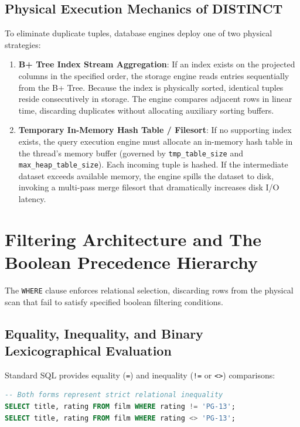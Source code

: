 \documentclass[10pt,journal,compsoc,onecolumn]{IEEEtran}
\begin{document}
\subsection{Physical Execution Mechanics of DISTINCT}
To eliminate duplicate tuples, database engines deploy one of two physical strategies:
\begin{enumerate}
    \item \textbf{B+ Tree Index Stream Aggregation}: If an index exists on the projected columns in the specified order, the storage engine reads entries sequentially from the B+ Tree. Because the index is physically sorted, identical tuples reside consecutively in storage. The engine compares adjacent rows in linear time, discarding duplicates without allocating auxiliary sorting buffers.
    \item \textbf{Temporary In-Memory Hash Table / Filesort}: If no supporting index exists, the query execution engine must allocate an in-memory hash table in the thread's memory buffer (governed by \texttt{tmp\_table\_size} and \texttt{max\_heap\_table\_size}). Each incoming tuple is hashed. If the intermediate dataset exceeds available memory, the engine spills the dataset to disk, invoking a multi-pass merge filesort that dramatically increases disk I/O latency.
\end{enumerate}

\section{Filtering Architecture and The Boolean Precedence Hierarchy}
\label{sec:filtering}

The \texttt{WHERE} clause enforces relational selection, discarding rows from the physical scan that fail to satisfy specified boolean filtering conditions.

\subsection{Equality, Inequality, and Binary Lexicographical Evaluation}
Standard SQL provides equality (\texttt{=}) and inequality (\texttt{!=} or \texttt{<>}) comparisons:
\begin{lstlisting}[language=SQL]
-- Both forms represent strict relational inequality
SELECT title, rating FROM film WHERE rating != 'PG-13';
SELECT title, rating FROM film WHERE rating <> 'PG-13';
\end{lstlisting}
\end{document}
